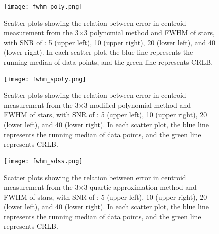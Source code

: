 \documentclass[12pt, preprint]{aastex}
\begin{document}
\begin{figure}[!htb]
  \texttt{[image: fwhm\_poly.png]}
\endminipage
\caption{Scatter plots showing the relation between error in centroid measurement
from the 3$\times$3 polynomial method and FWHM of stars, with SNR  of : 5 (upper left),
10 (upper right), 20 (lower left), and 40 (lower right). In each scatter plot, the blue
line represents the running median of data points, and the green line represents CRLB.}\label{7}
\end{figure}

\begin{figure}[!htb]
  \texttt{[image: fwhm\_spoly.png]}
\endminipage
\caption{Scatter plots showing the relation between error in centroid measurement
from the 3$\times$3 modified polynomial method and FWHM of stars, with SNR  of 
: 5 (upper left), 10 (upper right), 20 (lower left), and 40 (lower right). In each
scatter plot, the blue line represents the running median of data points, and the
green line represents CRLB.}\label{8}
\end{figure}

\begin{figure}[!htb]
  \texttt{[image: fwhm\_sdss.png]}
\endminipage
\caption{Scatter plots showing the relation between error in centroid measurement from
the 3$\times$3 quartic approximation method and FWHM of stars, with SNR  of : 5 (upper left),
10 (upper right), 20 (lower left), and 40 (lower right). In each scatter plot, the blue line
represents the running median of data points, and the green line represents CRLB.}\label{9}
\end{figure}
\end{document}
